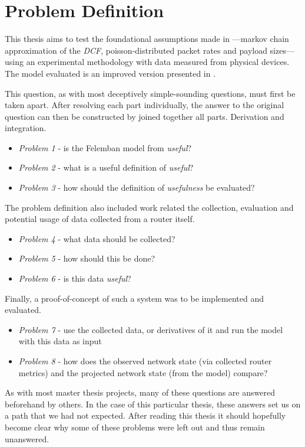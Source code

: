 \section{Problem Definition}

This thesis aims to test the foundational assumptions made in
\cite{bianchi}—markov chain approximation of the \emph{DCF},
poisson-distributed packet rates and payload sizes—using an experimental
methodology with data measured from physical devices. The model evaluated is
an improved version presented in \cite{felemban}.

This question, as with most deceptively simple-sounding questions, must first
be taken apart. After resolving each part individually, the answer to the
original question can then be constructed by joined together all parts.
Derivation and integration.

\begin{itemize}
\item \emph{Problem 1} - is the Felemban model from \cite{felemban} \emph{useful}?
\item \emph{Problem 2} - what is a useful definition of \emph{useful}?
\item \emph{Problem 3} - how should the definition of \emph{usefulness} be evaluated?
\end{itemize}

The problem definition also included work related the collection, evaluation
and potential usage of data collected from a router itself.

\begin{itemize}
\item \emph{Problem 4} - what data should be collected?
\item \emph{Problem 5} - how should this be done?
\item \emph{Problem 6} - is this data \emph{useful}?
\end{itemize}

Finally, a proof-of-concept of such a system was to be implemented and evaluated.

\begin{itemize}
\item \emph{Problem 7} - use the collected data, or derivatives of it and run the
model with this data as input
\item \emph{Problem 8} - how does the observed network state (via collected router
metrics) and the projected network state (from the model) compare?
\end{itemize}

As with most master thesis projects, many of these questions are answered
beforehand by others. In the case of this particular thesis, these answers set
us on a path that we had not expected. After reading this thesis it should
hopefully become clear why some of these problems were left out and thus
remain unanswered.
